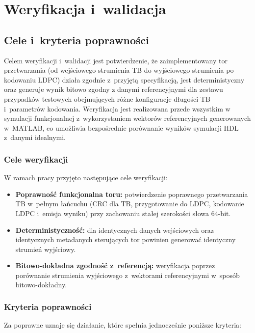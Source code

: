 \chapter{Weryfikacja i~walidacja}
\label{ch:weryfikacja_i_walidacja}

\section{Cele i~kryteria poprawności}
\label{sec:walidacja_cele_kryteria}

Celem weryfikacji i~walidacji jest potwierdzenie, że zaimplementowany tor przetwarzania
(od wejściowego strumienia TB do wyjściowego strumienia po kodowaniu LDPC) działa
zgodnie z~przyjętą specyfikacją, jest deterministyczny oraz generuje wynik bitowo zgodny
z danymi referencyjnymi dla zestawu przypadków testowych obejmujących różne konfiguracje
długości TB i~parametrów kodowania. Weryfikacja jest realizowana przede wszystkim
w symulacji funkcjonalnej z~wykorzystaniem wektorów referencyjnych generowanych w~MATLAB,
co umożliwia bezpośrednie porównanie wyników symulacji HDL z~danymi idealnymi. 

\subsection{Cele weryfikacji}

W ramach pracy przyjęto następujące cele weryfikacji:
\begin{itemize}
    \item \textbf{Poprawność funkcjonalna toru:} potwierdzenie poprawnego przetwarzania TB w~pełnym łańcuchu
    (CRC dla TB, przygotowanie do LDPC, kodowanie LDPC i~emisja wyniku) przy zachowaniu stałej szerokości słowa 64-bit.
    \item \textbf{Deterministyczność:} dla identycznych danych wejściowych oraz identycznych metadanych sterujących
    tor powinien generować identyczny strumień wyjściowy. 
    \item \textbf{Bitowo-dokładna zgodność z~referencją:} weryfikacja poprzez porównanie strumienia wyjściowego z~wektorami
    referencyjnymi w~sposób bitowo-dokładny. 
\end{itemize}

\subsection{Kryteria poprawności}

Za poprawne uznaje się działanie, które spełnia jednocześnie poniższe kryteria:

